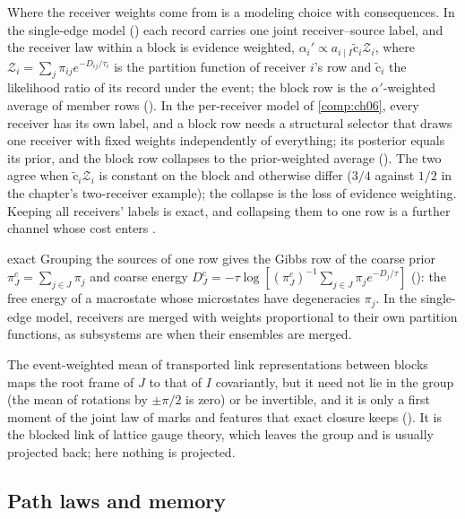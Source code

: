 Where the receiver weights come from is a modeling choice with consequences. In the single-edge model
() each record carries one joint receiver--source label, and the
receiver law within a block is evidence weighted,
$\alpha_i'\propto a_{i\mid I}\widetilde{\mathrm c}_i\mathcal Z_i$, where
$\mathcal Z_i=\sum_j\pi_{ij}e^{-D_{ij}/\tau_i}$ is the partition function of receiver $i$'s row and
$\widetilde{\mathrm c}_i$ the likelihood ratio of its record under the event; the block row is the
$\alpha'$-weighted average of member rows (). In the
per-receiver model of \cref{comp:ch06}, every receiver has its own label, and a block row needs a
structural selector that draws one receiver with fixed weights independently of everything; its
posterior equals its prior, and the block row collapses to the prior-weighted average
(). The two agree when $\widetilde{\mathrm c}_i\mathcal Z_i$
is constant on the block and otherwise differ ($3/4$ against $1/2$ in the chapter's two-receiver
example); the collapse is the loss of evidence weighting. Keeping all receivers' labels is exact, and
collapsing them to one row is a further channel whose cost enters .

\begin{analogy}{exact}
Grouping the sources of one row gives the Gibbs row of the coarse prior $\pi^c_J=\sum_{j\in J}\pi_j$ and
coarse energy $D^c_J=-\tau\log[(\pi^c_J)^{-1}\sum_{j\in J}\pi_je^{-D_j/\tau}]$
(): the free energy of a macrostate whose microstates have
degeneracies $\pi_j$. In the single-edge model, receivers are merged with weights proportional to their
own partition functions, as subsystems are when their ensembles are merged.
\end{analogy}

The event-weighted mean of transported link representations between blocks maps the root frame of $J$
to that of $I$ covariantly, but it need not lie in the group (the mean of rotations by $\pm\pi/2$ is
zero) or be invertible, and it is only a first moment of the joint law of marks and features that
exact closure keeps (). It is the blocked link of lattice gauge
theory, which leaves the group and is usually projected back; here nothing is projected.

\subsection{Path laws and memory}

